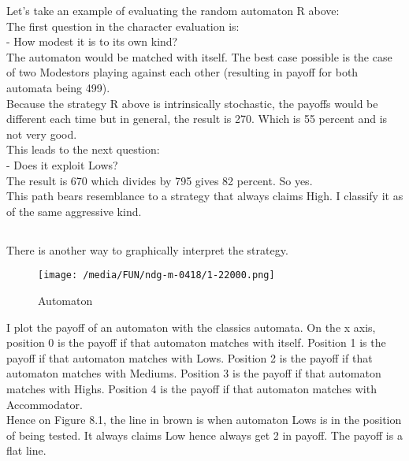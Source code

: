 \documentclass[12.5pt]{report}
\begin{document}
Let's take an example of evaluating the random automaton R above: \\
The first question in the character evaluation is: \\

- How modest it is to its own kind?\\

The automaton would be matched with itself. The best case possible is the case of two Modestors playing against each other (resulting in payoff for both automata being 499).\\

Because the strategy R above is intrinsically stochastic, the payoffs would be different each time but in general, the result is 270. Which is 55 percent and is not very good.\\

This leads to the next question:\\

- Does it exploit Lows?\\

The result is 670 which divides by 795 gives 82 percent. So yes.\\

This path bears resemblance to a strategy that always claims High. I classify it as of the same aggressive kind.\\

\subsection{}

There is another way to graphically interpret the strategy.

\begin{figure}[h!]
\center
\texttt{[image: /media/FUN/ndg-m-0418/1-22000.png]}
\caption{Automaton}
\end{figure}

I plot the payoff of an automaton with the classics automata. On the x axis, position 0 is the payoff if that automaton matches with itself. Position 1 is the payoff if that automaton matches with Lows. Position 2 is the payoff if that automaton matches with Mediums. Position 3 is the payoff if that automaton matches with Highs. Position 4 is the payoff if that automaton matches with Accommodator.\\

Hence on Figure 8.1, the line in brown is when automaton Lows is in the position of being tested. It always claims Low hence always get 2 in payoff. The payoff is a flat line.\\
\end{document}
